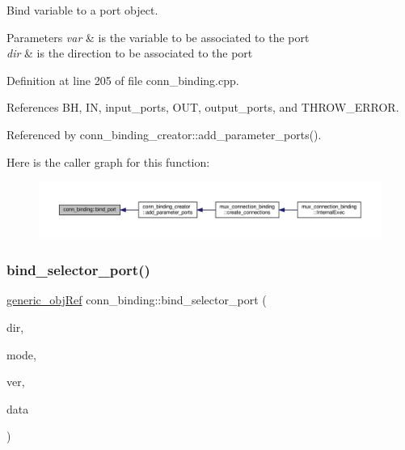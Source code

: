 Bind variable to a port object. 


\begin{DoxyParams}{Parameters}
{\em var} & is the variable to be associated to the port \\
\hline
{\em dir} & is the direction to be associated to the port \\
\hline
\end{DoxyParams}


Definition at line 205 of file conn\+\_\+binding.\+cpp.



References BH, IN, input\+\_\+ports, O\+UT, output\+\_\+ports, and T\+H\+R\+O\+W\+\_\+\+E\+R\+R\+OR.



Referenced by conn\+\_\+binding\+\_\+creator\+::add\+\_\+parameter\+\_\+ports().

Here is the caller graph for this function\+:
\nopagebreak
\begin{figure}[H]
\begin{center}
\leavevmode
\includegraphics[width=350pt]{d2/db1/classconn__binding_a15ab7a8e03857a8a11ce016944f7aaab_icgraph}
\end{center}
\end{figure}
\mbox{\label{classconn__binding_ad6d2c05551ea948d7ce6b4e015292e5e}} 
\subsubsection{\texorpdfstring{bind\+\_\+selector\+\_\+port()}{bind\_selector\_port()}\hspace{0.1cm}{\footnotesize\ttfamily [1/2]}}
{\footnotesize\ttfamily \hyperlink{generic__obj_8hpp_acb533b2ef8e0fe72e09a04d20904ca81}{generic\+\_\+obj\+Ref} conn\+\_\+binding\+::bind\+\_\+selector\+\_\+port (\begin{DoxyParamCaption}\item[{\hyperlink{classconn__binding_af1575e7a7dc7acd00fc5c947f413c663}{conn\+\_\+binding\+::direction\+\_\+type}}]{dir,  }\item[{unsigned int}]{mode,  }\item[{const \hyperlink{graph_8hpp_abefdcf0544e601805af44eca032cca14}{vertex} \&}]{ver,  }\item[{const \hyperlink{op__graph_8hpp_a9a0b240622c47584bee6951a6f5de746}{Op\+Graph\+Const\+Ref}}]{data }\end{DoxyParamCaption})}



